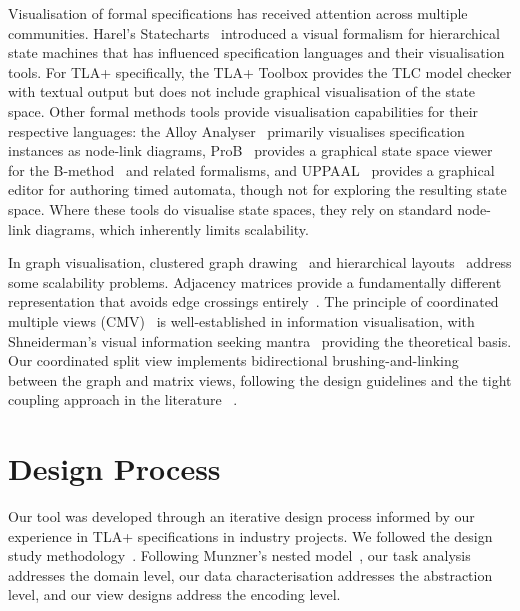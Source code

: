 \documentclass[conference]{IEEEtran}
\begin{document}
Visualisation of formal specifications has received attention across multiple communities. Harel's Statecharts~\cite{harel1987statecharts} introduced a visual formalism for hierarchical state machines that has influenced specification languages and their visualisation tools. For TLA+ specifically, the TLA+ Toolbox provides the TLC model checker with textual output but does not include graphical visualisation of the state space. Other formal methods tools provide visualisation capabilities for their respective languages: the Alloy Analyser~\cite{jackson2012alloy} primarily visualises specification instances as node-link diagrams, ProB~\cite{leuschel2008prob} provides a graphical state space viewer for the B-method~\cite{abrial1996bbook} and related formalisms, and UPPAAL~\cite{behrmann2004uppaal} provides a graphical editor for authoring timed automata, though not for exploring the resulting state space. Where these tools do visualise state spaces, they rely on standard node-link diagrams, which inherently limits scalability.

In graph visualisation, clustered graph drawing~\cite{eades1996hierarchical} and hierarchical layouts~\cite{sugiyama1981hierarchical} address some scalability problems. Adjacency matrices provide a fundamentally different representation that avoids edge crossings entirely~\cite{bertin1983semiology, behrisch2016reordering}. The principle of coordinated multiple views (CMV)~\cite{roberts2007cmv} is well-established in information visualisation, with Shneiderman's visual information seeking mantra~\cite{shneiderman1996eyes} providing the theoretical basis. Our coordinated split view implements bidirectional brushing-and-linking between the graph and matrix views, following the design guidelines and the tight coupling approach in the literature ~\cite{north2000snap,baldonado2000guidelines}.

\section{Design Process}


Our tool was developed through an iterative design process informed by our experience in TLA+ specifications in industry projects. We followed the design study methodology~\cite{sedlmair2012design}. Following Munzner's nested model~\cite{munzner2009nested}, our task analysis addresses the domain level, our data characterisation addresses the abstraction level, and our view designs address the encoding level.
\end{document}
